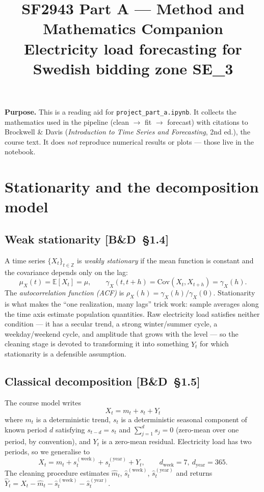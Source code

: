 \documentclass[11pt,a4paper]{article}
\title{\vspace{-2.5em}SF2943 Part A --- Method and Mathematics Companion\\
\large Electricity load forecasting for Swedish bidding zone SE\_3}
\author{}
\date{}
\newcommand{\E}{\mathbb{E}}
\newcommand{\Cov}{\mathrm{Cov}}
\newcommand{\BD}[1]{\textsc{[B\&D~§#1]}}
\begin{document}
\maketitle
\vspace{-2.5em}

\noindent\textbf{Purpose.} This is a reading aid for \texttt{project\_part\_a.ipynb}.
It collects the mathematics used in the pipeline (clean $\to$ fit $\to$ forecast)
with citations to Brockwell \& Davis (\emph{Introduction to Time Series and
Forecasting}, 2nd ed.), the course text. It does \emph{not} reproduce numerical
results or plots --- those live in the notebook.

\section{Stationarity and the decomposition model}

\subsection*{Weak stationarity \BD{1.4}}
A time series $\{X_t\}_{t \in \mathbb{Z}}$ is \emph{weakly stationary} if the
mean function is constant and the covariance depends only on the lag:
\begin{equation}
\mu_X(t) = \E[X_t] = \mu, \qquad
\gamma_X(t, t+h) = \Cov(X_t, X_{t+h}) = \gamma_X(h).
\label{eq:stationary}
\end{equation}
The \emph{autocorrelation function (ACF)} is $\rho_X(h) = \gamma_X(h)/\gamma_X(0)$.
Stationarity is what makes the ``one realization, many lags'' trick work: sample
averages along the time axis estimate population quantities. Raw electricity load
satisfies neither condition --- it has a secular trend, a strong winter/summer
cycle, a weekday/weekend cycle, and amplitude that grows with the level --- so
the cleaning stage is devoted to transforming it into something
$\hat Y_t$ for which stationarity is a defensible assumption.

\subsection*{Classical decomposition \BD{1.5}}
The course model writes
\begin{equation}
X_t = m_t + s_t + Y_t
\label{eq:decomp}
\end{equation}
where $m_t$ is a deterministic trend, $s_t$ is a deterministic seasonal component
of known period $d$ satisfying $s_{t-d} = s_t$ and
$\sum_{j=1}^d s_j = 0$ (zero-mean over one period, by convention), and $Y_t$ is
a zero-mean residual. Electricity load has two periods, so we generalise to
\begin{equation}
X_t = m_t + s_t^{(\text{week})} + s_t^{(\text{year})} + Y_t,
\qquad d_{\text{week}} = 7,\ d_{\text{year}} = 365.
\end{equation}
The cleaning procedure estimates $\hat m_t$, $\hat s_t^{(\text{week})}$,
$\hat s_t^{(\text{year})}$ and returns
$\hat Y_t = X_t - \hat m_t - \hat s_t^{(\text{week})} - \hat s_t^{(\text{year})}$.
\end{document}
